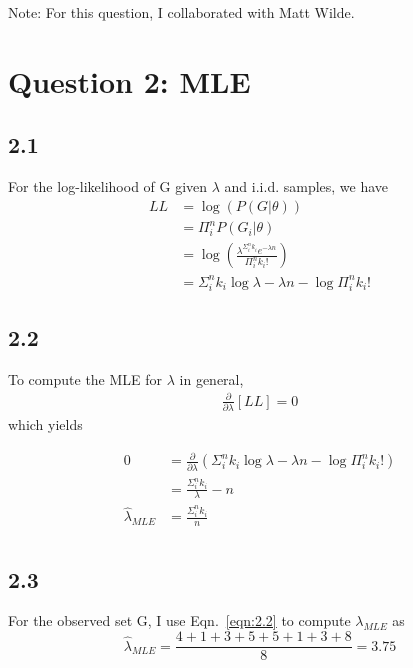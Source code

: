 \documentclass[12pt]{amsart}
\begin{document}
Note: For this question, I collaborated with Matt Wilde.

\section*{Question 2: MLE}

\subsection*{2.1}

For the log-likelihood of G given $\lambda$ and i.i.d. samples, we have
\begin{equation} \label{eqn:2.1}
\begin{split}
LL & = \log \left( P(G | \theta)  \right) \\
& = \Pi_i^n P(G_i | \theta) \\
& = \log \left( \frac{\lambda^{\Sigma_i^n k_i} e^{-\lambda n}}{\Pi_i^n k_i !} \right) \\
& = \Sigma_i^n k_i \log \lambda - \lambda n - \log \Pi_i^n k_i !
\end{split}
\end{equation}

\subsection*{2.2}

To compute the MLE for $\lambda$ in general,
\begin{equation} 
\begin{split}
\frac{\partial}{\partial \lambda} \left[ LL \right] = 0
\end{split}
\end{equation}
which yields

\begin{equation} \label{eqn:2.2}
\begin{split}
0 & = \frac{\partial}{\partial \lambda} \left( \Sigma_i^n k_i \log \lambda - \lambda n - \log \Pi_i^n k_i ! \right) \\ 
& = \frac{\Sigma_i^n k_i}{\lambda} - n \\
\hat{\lambda}_{MLE} & = \frac{\Sigma_i^n k_i}{n} \\
\end{split}
\end{equation}

\subsection*{2.3}
For the observed set G, I use Eqn.~\ref{eqn:2.2} to compute $\lambda_{MLE}$ as
\begin{equation}
\hat{\lambda}_{MLE} = \frac{4+1+3+5+5+1+3+8}{8} = 3.75
\end{equation}
\end{document}
